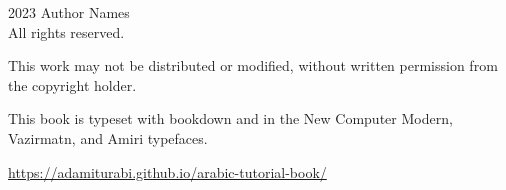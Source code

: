 \thispagestyle{empty}
\begingroup
\footnotesize
\parindent 0pt
\parskip \baselineskip
\textcopyright{} 2023 Author Names \\
All rights reserved.

    This work may not be distributed or modified, without written permission from the copyright holder.

\texttt{\gitTag}

This book is typeset with bookdown and \XeLaTeX 
in the New Computer Modern, Vazirmatn, and Amiri typefaces.

\vfill

\url{https://adamiturabi.github.io/arabic-tutorial-book/}

\vspace*{2\baselineskip}


\endgroup
\clearpage
